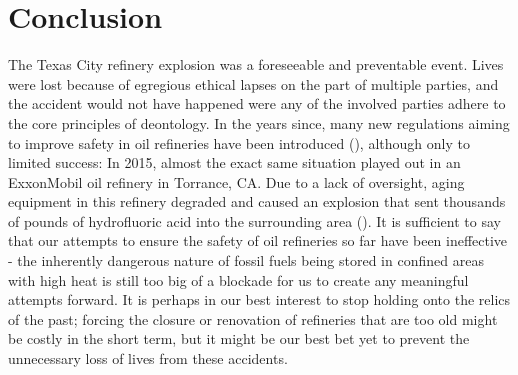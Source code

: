 \documentclass[12pt]{article}
\begin{document}
	\section*{Conclusion}
	The Texas City refinery explosion was a foreseeable and preventable event. Lives were lost because of egregious ethical lapses on the part of multiple parties, and the accident would not have happened were any of the involved parties adhere to the core principles of deontology. In the years since, many new regulations aiming to improve safety in oil refineries have been introduced (\cite{calaw}), although only to limited success: In 2015, almost the exact same situation played out in an ExxonMobil oil refinery in Torrance, CA. Due to a lack of oversight, aging equipment in this refinery degraded and caused an explosion that sent thousands of pounds of hydrofluoric acid into the surrounding area (\cite{exxonmobilreport}). It is sufficient to say that our attempts to ensure the safety of oil refineries so far have been ineffective - the inherently dangerous nature of fossil fuels being stored in confined areas with high heat is still too big of a blockade for us to create any meaningful attempts forward. It is perhaps in our best interest to stop holding onto the relics of the past; forcing the closure or renovation of refineries that are too old might be costly in the short term, but it might be our best bet yet to prevent the unnecessary loss of lives from these accidents.
	
	\printbibliography
\end{document}
